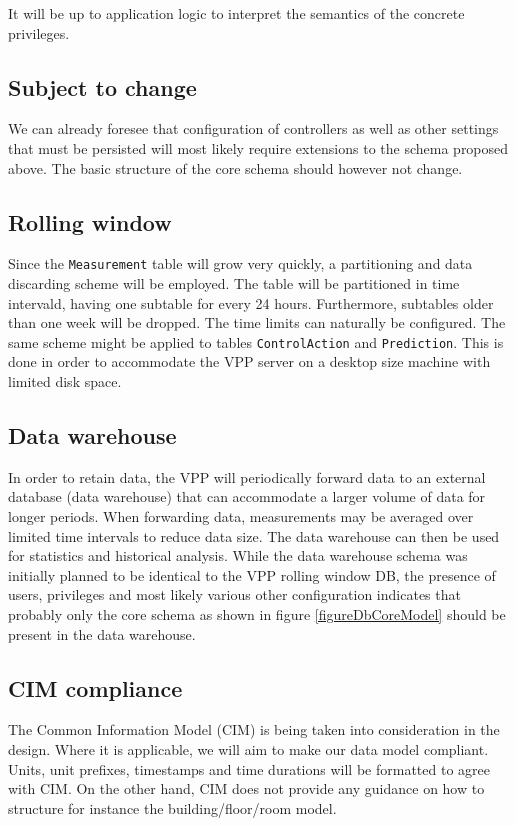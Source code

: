 It will be up to application logic to interpret the semantics of the concrete privileges.

\subsection{Subject to change}
We can already foresee that configuration of controllers as well as other settings that must be persisted will most likely require extensions to the schema proposed above. The basic structure of the core schema should however not change.

\subsection{Rolling window}\label{subsection:rollingwindow}
Since the \texttt{Measurement} table will grow very quickly, a partitioning and data discarding scheme will be employed. The table will be partitioned in time intervald, having one subtable for every 24 hours. Furthermore, subtables older than one week will be dropped. The time limits can naturally be configured. The same scheme might be applied to tables \texttt{ControlAction} and \texttt{Prediction}.
This is done in order to accommodate the VPP server on a desktop size machine with limited disk space.

\subsection{Data warehouse}
In order to retain data, the VPP will periodically forward data to an external database (data warehouse) that can accommodate a larger volume of data for longer periods. When forwarding data, measurements may be averaged over limited time intervals to reduce data size. The data warehouse can then be used for statistics and historical analysis. While the data warehouse schema was initially planned to be identical to the VPP rolling window DB, the presence of users, privileges and most likely various other configuration indicates that probably only the core schema as shown in figure \ref{figureDbCoreModel} should be present in the data warehouse. 

\subsection{CIM compliance}
The Common Information Model (CIM) is being taken into consideration in the design. Where it is applicable, we will aim to make our data model compliant. Units, unit prefixes, timestamps and time durations will be formatted to agree with CIM. On the other hand, CIM does not provide any guidance on how to structure for instance the building/floor/room model.


